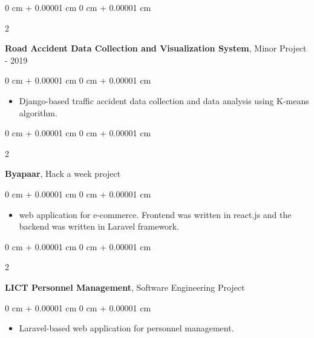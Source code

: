 \documentclass[10pt, letterpaper]{article}
\newenvironment{highlights}{
    \begin{itemize}[
        topsep=0.10 cm,
        parsep=0.10 cm,
        partopsep=0pt,
        itemsep=0.05cm,
        leftmargin=0 cm + 10pt
    ]
}{
    \end{itemize}
} %
\newenvironment{onecolentry}{
    \begin{adjustwidth}{
        0 cm + 0.00001 cm
    }{
        0 cm + 0.00001 cm
    }
}{
    \end{adjustwidth}
} %
\newenvironment{twocolentry}[2][]{
    \onecolentry
    \def\secondColumn{#2}
    \setcolumnwidth{\fill, 4.5 cm}
    \begin{paracol}{2}
}{
    \switchcolumn \raggedleft \secondColumn
    \end{paracol}
    \endonecolentry
} %
\begin{document}
        \vspace{0.2 cm}

        \begin{twocolentry}{
            2018 - 2019
        }
            \textbf{Road Accident Data Collection and Visualization System}, Minor Project\end{twocolentry}

        \vspace{0.10 cm}
        \begin{onecolentry}
            \begin{highlights}
                \item Django-based traffic accident data collection and data analysis using K-means algorithm.
            \end{highlights}
        \end{onecolentry}


        \vspace{0.2 cm}

        \begin{twocolentry}{
            2019
        }
            \textbf{Byapaar}, Hack a week project\end{twocolentry}

        \vspace{0.10 cm}
        \begin{onecolentry}
            \begin{highlights}
                \item web application for e-commerce. Frontend was written in react.js and the backend was written in Laravel framework.
            \end{highlights}
        \end{onecolentry}

        \vspace{0.2 cm}

        \begin{twocolentry}{
            2018
        }
            \textbf{LICT Personnel Management}, Software Engineering Project\end{twocolentry}

        \vspace{0.10 cm}
        \begin{onecolentry}
            \begin{highlights}
                \item Laravel-based web application for personnel management.
            \end{highlights}
        \end{onecolentry}
        
\end{document}

